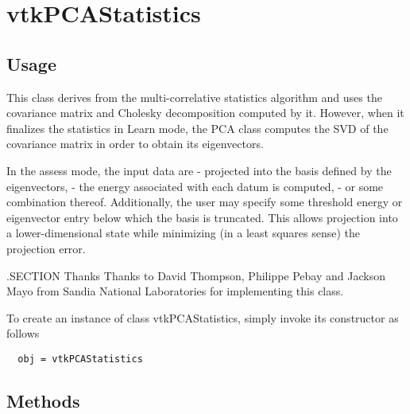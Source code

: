 \section{vtkPCAStatistics}

\subsection{Usage}

 This class derives from the multi-correlative statistics algorithm and
 uses the covariance matrix and Cholesky decomposition computed by it.
 However, when it finalizes the statistics in Learn mode, the PCA class
 computes the SVD of the covariance matrix in order to obtain its eigenvectors.

 In the assess mode, the input data are
 - projected into the basis defined by the eigenvectors,
 - the energy associated with each datum is computed,
 - or some combination thereof.
 Additionally, the user may specify some threshold energy or
 eigenvector entry below which the basis is truncated. This allows
 projection into a lower-dimensional state while minimizing (in a 
 least squares sense) the projection error.


 .SECTION Thanks
 Thanks to David Thompson, Philippe Pebay and Jackson Mayo from
 Sandia National Laboratories for implementing this class.

To create an instance of class vtkPCAStatistics, simply
invoke its constructor as follows
\begin{verbatim}
  obj = vtkPCAStatistics
\end{verbatim}
\subsection{Methods}

